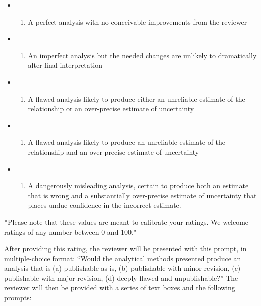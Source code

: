 \documentclass[
  english,
  man]{apa6}
\providecommand{\tightlist}{%
  \setlength{\itemsep}{0pt}\setlength{\parskip}{0pt}}
\begin{document}
\begin{itemize}
\item
  \begin{enumerate}
  \def\labelenumi{\arabic{enumi}.}
  \setcounter{enumi}{99}
  \tightlist
  \item
    A perfect analysis with no conceivable improvements from the reviewer
  \end{enumerate}
\item
  \begin{enumerate}
  \def\labelenumi{\arabic{enumi}.}
  \setcounter{enumi}{74}
  \tightlist
  \item
    An imperfect analysis but the needed changes are unlikely to dramatically alter final interpretation
  \end{enumerate}
\item
  \begin{enumerate}
  \def\labelenumi{\arabic{enumi}.}
  \setcounter{enumi}{49}
  \tightlist
  \item
    A flawed analysis likely to produce either an unreliable estimate of the relationship or an over-precise estimate of uncertainty
  \end{enumerate}
\item
  \begin{enumerate}
  \def\labelenumi{\arabic{enumi}.}
  \setcounter{enumi}{24}
  \tightlist
  \item
    A flawed analysis likely to produce an unreliable estimate of the relationship and an over-precise estimate of uncertainty
  \end{enumerate}
\item
  \begin{enumerate}
  \def\labelenumi{\arabic{enumi}.}
  \setcounter{enumi}{-1}
  \tightlist
  \item
    A dangerously misleading analysis, certain to produce both an estimate that is wrong and a substantially over-precise estimate of uncertainty that places undue confidence in the incorrect estimate.
  \end{enumerate}
\end{itemize}

*Please note that these values are meant to calibrate your ratings.
We welcome ratings of any number between 0 and 100."

After providing this rating, the reviewer will be presented with this prompt, in multiple-choice format: \enquote{Would the analytical methods presented produce an analysis that is (a) publishable as is, (b) publishable with minor revision, (c) publishable with major revision, (d) deeply flawed and unpublishable?}
The reviewer will then be provided with a series of text boxes and the following prompts:
\end{document}
